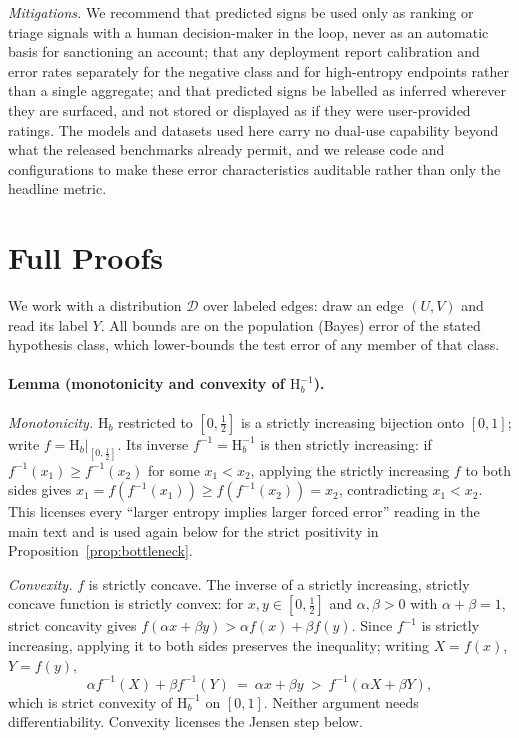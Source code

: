 \documentclass[sigconf]{acmart}
\newcommand{\Hh}{\mathrm{H}}
\theoremstyle{plain}
\theoremstyle{definition}
\begin{document}
\emph{Mitigations.} We recommend that predicted signs be used only as ranking or triage signals with a human decision-maker in the loop, never as an automatic basis for sanctioning an account; that any deployment report calibration and error rates separately for the negative class and for high-entropy endpoints rather than a single aggregate; and that predicted signs be labelled as inferred wherever they are surfaced, and not stored or displayed as if they were user-provided ratings. The models and datasets used here carry no dual-use capability beyond what the released benchmarks already permit, and we release code and configurations to make these error characteristics auditable rather than only the headline metric.




\appendix
\section{Full Proofs}
\label{app:proofs}
We work with a distribution $\mathcal{D}$ over labeled edges: draw an edge $(U,V)$ and read its label $Y$. All bounds are on the population (Bayes) error of the stated hypothesis class, which lower-bounds the test error of any member of that class.

\paragraph{Lemma (monotonicity and convexity of $\Hh_b^{-1}$).}
\emph{Monotonicity.} $\Hh_b$ restricted to $[0,\tfrac12]$ is a strictly increasing bijection onto $[0,1]$; write $f=\Hh_b|_{[0,\tfrac12]}$. Its inverse $f^{-1}=\Hh_b^{-1}$ is then strictly increasing: if $f^{-1}(x_1)\ge f^{-1}(x_2)$ for some $x_1<x_2$, applying the strictly increasing $f$ to both sides gives $x_1=f(f^{-1}(x_1))\ge f(f^{-1}(x_2))=x_2$, contradicting $x_1<x_2$. This licenses every ``larger entropy implies larger forced error'' reading in the main text and is used again below for the strict positivity in Proposition~\ref{prop:bottleneck}.

\emph{Convexity.} $f$ is strictly concave. The inverse of a strictly increasing, strictly concave function is strictly convex: for $x,y\in[0,\tfrac12]$ and $\alpha,\beta>0$ with $\alpha+\beta=1$, strict concavity gives $f(\alpha x+\beta y) > \alpha f(x)+\beta f(y)$. Since $f^{-1}$ is strictly increasing, applying it to both sides preserves the inequality; writing $X=f(x)$, $Y=f(y)$,
\[
\alpha f^{-1}(X)+\beta f^{-1}(Y) \ =\ \alpha x+\beta y \ >\ f^{-1}(\alpha X+\beta Y),
\]
which is strict convexity of $\Hh_b^{-1}$ on $[0,1]$. Neither argument needs differentiability. Convexity licenses the Jensen step below.
\end{document}
